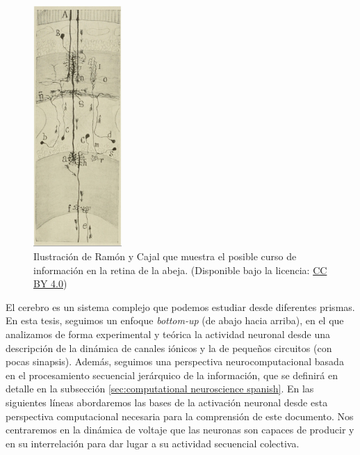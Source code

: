\begin{figure}[htb!]
    \centering
    \includegraphics[width=0.3\textwidth]{img/intro/cajal-flow_small.jpg}
    \caption{Ilustración de Ramón y Cajal que muestra el posible curso de información en la retina de la abeja. \parencite{ramonycajal_sobre_1915} (Disponible bajo la licencia: \href{https://creativecommons.org/licenses/by-sa/4.0/}{CC BY 4.0})}
    \label{fig:cajal-neuron spanish}
\end{figure}

El cerebro es un sistema complejo que podemos estudiar desde diferentes prismas. En esta tesis, seguimos un enfoque \textit{bottom-up} (de abajo hacia arriba), en el que analizamos de forma experimental y teórica la actividad neuronal desde una descripción de la dinámica de canales iónicos y la de pequeños circuitos (con pocas sinapsis). Además, seguimos una perspectiva neurocomputacional basada en el procesamiento secuencial jerárquico de la información, que se definirá en detalle en la subsección \ref{sec:computational neuroscience spanish}. En las siguientes líneas abordaremos las bases de la activación neuronal desde esta perspectiva computacional necesaria para la comprensión de este documento. Nos centraremos en la dinámica de voltaje que las neuronas son capaces de producir y en su interrelación para dar lugar a su actividad secuencial colectiva.


